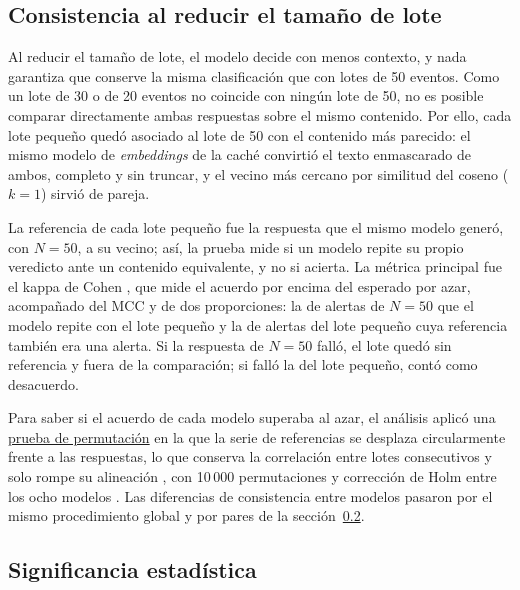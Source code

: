 \subsection{Consistencia al reducir el tamaño de lote}

Al reducir el tamaño de lote, el modelo decide con menos contexto, y nada garantiza que conserve la misma clasificación que con lotes de 50 eventos. Como un lote de 30 o de 20 eventos no coincide con ningún lote de 50, no es posible comparar directamente ambas respuestas sobre el mismo contenido. Por ello, cada lote pequeño quedó asociado al lote de 50 con el contenido más parecido: el mismo modelo de \textit{embeddings} de la caché convirtió el texto enmascarado de ambos, completo y sin truncar, y el vecino más cercano por similitud del coseno ($k = 1$) sirvió de pareja.

La referencia de cada lote pequeño fue la respuesta que el mismo modelo generó, con $N = 50$, a su vecino; así, la prueba mide si un modelo repite su propio veredicto ante un contenido equivalente, y no si acierta. La métrica principal fue el kappa de Cohen \cite{cohen1960_kappa}, que mide el acuerdo por encima del esperado por azar, acompañado del MCC y de dos proporciones: la de alertas de $N = 50$ que el modelo repite con el lote pequeño y la de alertas del lote pequeño cuya referencia también era una alerta. Si la respuesta de $N = 50$ falló, el lote quedó sin referencia y fuera de la comparación; si falló la del lote pequeño, contó como desacuerdo.

Para saber si el acuerdo de cada modelo superaba al azar, el análisis aplicó una \uline{prueba de permutación} en la que la serie de referencias se desplaza circularmente frente a las respuestas, lo que conserva la correlación entre lotes consecutivos y solo rompe su alineación \cite{good2005_permutation}, con 10\,000 permutaciones y corrección de Holm entre los ocho modelos \cite{holm1979_sequential}. Las diferencias de consistencia entre modelos pasaron por el mismo procedimiento global y por pares de la sección~\ref{subsec:met_significancia}.

\subsection{Significancia estadística}\label{subsec:met_significancia}

